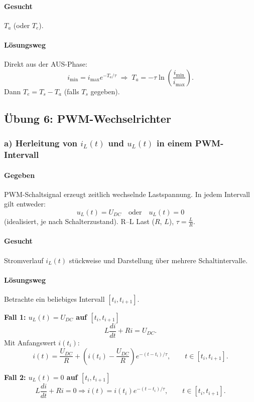 \paragraph{Gesucht}
$T_a$ (oder $T_e$).

\paragraph{Lösungsweg}
Direkt aus der AUS-Phase:
\[
i_{\min}=i_{\max}e^{-T_a/\tau}
\;\Rightarrow\;
\boxed{T_a=-\tau\ln\!\left(\frac{i_{\min}}{i_{\max}}\right)}.
\]
Dann $T_e=T_s-T_a$ (falls $T_s$ gegeben).


\subsection{Übung 6: PWM-Wechselrichter }

\subsubsection*{a) Herleitung von $i_L(t)$ und $u_L(t)$ in einem PWM-Intervall}

\paragraph{Gegeben}
PWM-Schaltsignal erzeugt zeitlich wechselnde Lastspannung.
In jedem Intervall gilt entweder:
\[
u_L(t)=U_{DC}\quad \text{oder}\quad u_L(t)=0
\]
(idealisiert, je nach Schalterzustand).
R--L Last ($R$, $L$), $\tau=\frac{L}{R}$.

\paragraph{Gesucht}
Stromverlauf $i_L(t)$ stückweise und Darstellung über mehrere Schaltintervalle.

\paragraph{Lösungsweg}
Betrachte ein beliebiges Intervall $[t_i,t_{i+1}]$.

\textbf{Fall 1: $u_L(t)=U_{DC}$ auf $[t_i,t_{i+1}]$}
\[
L\frac{di}{dt}+Ri=U_{DC}.
\]
Mit Anfangswert $i(t_i)$:
\[
\boxed{
i(t)=\frac{U_{DC}}{R}+\left(i(t_i)-\frac{U_{DC}}{R}\right)e^{-(t-t_i)/\tau}
},\qquad t\in[t_i,t_{i+1}].
\]

\textbf{Fall 2: $u_L(t)=0$ auf $[t_i,t_{i+1}]$}
\[
L\frac{di}{dt}+Ri=0
\Rightarrow
\boxed{
i(t)=i(t_i)e^{-(t-t_i)/\tau}
},\qquad t\in[t_i,t_{i+1}].
\]

